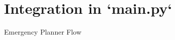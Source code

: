\section{Integration in `main.py`}
\begin{frame}{Emergency Planner Flow}
    \vspace{2cm}
\end{frame}